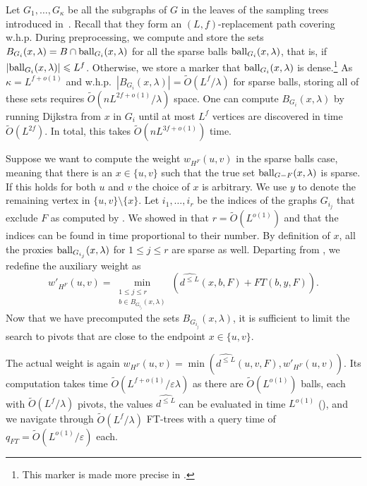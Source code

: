 \documentclass{theoretics}
\newcommand*{\Otilde}{\widetilde{O}}
\newcommand*{\ball}{\mbox{\rm ball}}
\renewcommand{\le}{\leqslant}
\begin{document}
Let $G_1, \ldots, G_\kappa$ be all the subgraphs of $G$ in the leaves of the sampling trees
introduced in~.
Recall that they form an $(L,f)$-replacement path covering w.h.p.
During preprocessing, we compute and store the sets 
$B_{G_i}(x, \lambda) = B \cap \ball_{G_i}(x,\lambda)$ 
for all the sparse balls $\ball_{G_i}(x, \lambda)$, 
that is, if $|\ball_{G_i}(x, \lambda)| \le L^f$.
Otherwise, we store a marker that $\ball_{G_i}(x, \lambda)$ is dense.\footnote{
	This marker is made more precise in .
} 
As $\kappa = L^{f+o(1)}$ and w.h.p.\ $|B_{G_i}(x, \lambda)| = \Otilde(L^{f}/\lambda)$
for sparse balls, storing all of these sets requires 
$\Otilde(nL^{2f+o(1)}/\lambda)$ space.
One can compute $B_{G_i}(x, \lambda)$ by running Dijkstra from $x$ in $G_i$ until at most $L^{f}$ vertices are discovered in time $\Otilde(L^{2f})$.
In total, this takes $\Otilde(nL^{3f+o(1)})$ time.

Suppose we want to compute the weight $w_{H^F}(u,v)$ in the sparse balls case,
meaning that there is an $x \in \{u,v\}$ such that the true set $\ball_{G-F}(x,\lambda)$ is sparse.
If this holds for both $u$ and $v$ the choice of $x$ is arbitrary.
We use $y$ to denote the remaining vertex in $\{u,v\}{\setminus}\{x\}$.
Let $i_1, \ldots, i_r$ be the indices of the graphs $G_{i_j}$ that exclude $F$ 
as computed by . 
We showed in  
that $r =\Otilde(L^{o(1)})$ and that the indices can be found in time proportional to their number.
By definition of $x$, all the proxies $\ball_{G_{i_j}}(x,\lambda)$ for $1 \le j \le r$ are sparse as well.
Departing from , we redefine the auxiliary weight as
\begin{equation}
\label{eq:sparse-pivots}
	w'_{H^F}(u,v) = \min_{
		\substack{
			1\le j \le r \\
			b \in B_{G_{i_j}}(x,\lambda)} 
		}\left(\widehat{d^{\le L}}(x,b,F) + FT(b,y,F)\right).
\end{equation}
Now that we have precomputed the sets $B_{G_{i_j}}(x,\lambda)$,
it is sufficient to limit the search to pivots that are close to the endpoint $x \in \{u, v\}$.

The actual weight is again
$w_{H^F}(u,v) = \min(\widehat{d^{\le L}}(u,v,F), w'_{H^F}(u,v))$.
Its computation takes time $\Otilde(L^{f+o(1)}/\varepsilon\lambda)$
as there are $\Otilde(L^{o(1)})$ balls, each with $\Otilde(L^f/\lambda)$ pivots,
the values $\widehat{d^{\le L}}$
can be evaluated in time $L^{o(1)}$ (),
and we navigate through $\Otilde(L^{f}/\lambda)$ FT-trees
with a query time of $q_{FT} = \Otilde(L^{o(1)}/\varepsilon)$ each. 
\end{document}
